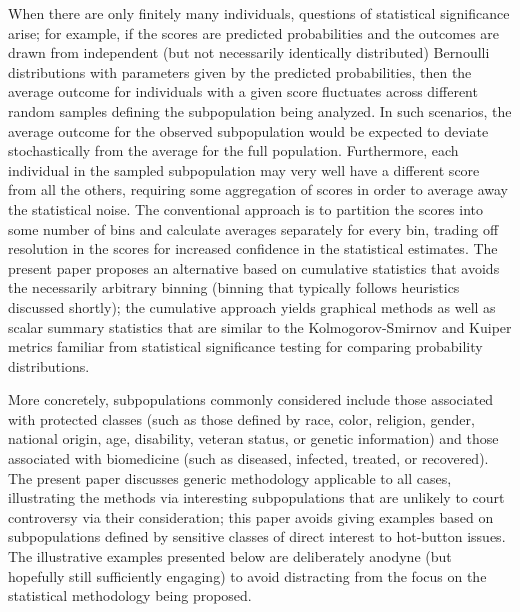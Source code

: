 \documentclass{article}
\begin{document}
When there are only finitely many individuals,
questions of statistical significance arise;
for example, if the scores are predicted probabilities
and the outcomes are drawn from independent (but not necessarily
identically distributed) Bernoulli distributions with parameters
given by the predicted probabilities, then the average outcome
for individuals with a given score fluctuates across different random samples
defining the subpopulation being analyzed.
In such scenarios, the average outcome for the observed subpopulation
would be expected to deviate stochastically from the average
for the full population.
Furthermore, each individual in the sampled subpopulation may very well
have a different score from all the others, requiring some aggregation
of scores in order to average away the statistical noise.
The conventional approach is to partition the scores into some number of bins
and calculate averages separately for every bin, trading off resolution
in the scores for increased confidence in the statistical estimates.
The present paper proposes an alternative based on cumulative statistics
that avoids the necessarily arbitrary binning
(binning that typically follows heuristics discussed shortly);
the cumulative approach yields graphical methods
as well as scalar summary statistics that are similar
to the Kolmogorov-Smirnov and Kuiper metrics familiar
from statistical significance testing for comparing probability distributions.

More concretely, subpopulations commonly considered include those associated
with protected classes (such as those defined by race, color, religion, gender,
national origin, age, disability, veteran status, or genetic information)
and those associated with biomedicine (such as diseased, infected, treated,
or recovered).
The present paper discusses generic methodology applicable to all cases,
illustrating the methods via interesting subpopulations that are unlikely
to court controversy via their consideration; this paper avoids
giving examples based on subpopulations defined by sensitive classes
of direct interest to hot-button issues.
The illustrative examples presented below are deliberately anodyne
(but hopefully still sufficiently engaging) to avoid distracting
from the focus on the statistical methodology being proposed.
\end{document}
